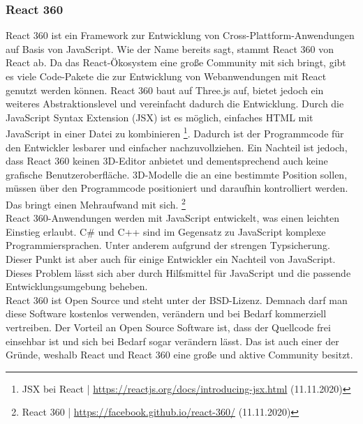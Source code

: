 \documentclass[a4paper,12pt,oneside]{article}
\begin{document}
      \subsubsection{React 360}
        React 360 ist ein Framework zur Entwicklung von Cross-Plattform-Anwendungen auf
        Basis von JavaScript. Wie der Name bereits sagt, stammt React 360 von React ab.
        Da das React-Ökosystem eine große Community mit sich bringt, gibt es viele
        Code-Pakete die zur Entwicklung von Webanwendungen mit React genutzt werden können.
        React 360 baut auf Three.js auf, bietet jedoch ein weiteres Abstraktionslevel und
        vereinfacht dadurch die Entwicklung. Durch die JavaScript Syntax Extension (JSX)
        ist es möglich, einfaches HTML mit JavaScript in einer Datei zu kombinieren \footnote{JSX bei React | \url{https://reactjs.org/docs/introducing-jsx.html} (11.11.2020)}.
        Dadurch ist der Programmcode für den Entwickler lesbarer und einfacher nachzuvollziehen.
        Ein Nachteil ist jedoch, dass React 360 keinen 3D-Editor anbietet und dementsprechend
        auch keine grafische Benutzeroberfläche. 3D-Modelle die
        an eine bestimmte Position sollen, müssen über den Programmcode positioniert und
        daraufhin kontrolliert werden. Das bringt einen Mehraufwand mit sich.
        \footnote{React 360 | \url{https://facebook.github.io/react-360/} (11.11.2020)} \\
        React 360-Anwendungen werden mit JavaScript entwickelt, was einen leichten Einstieg
        erlaubt. C\# und C++ sind im Gegensatz zu JavaScript komplexe
        Programmiersprachen. Unter anderem aufgrund der strengen Typsicherung. Dieser
        Punkt ist aber auch für einige Entwickler ein Nachteil von JavaScript. Dieses
        Problem lässt sich aber durch Hilfsmittel für JavaScript und die passende 
        Entwicklungsumgebung beheben. \\
        React 360 ist Open Source und steht unter der BSD-Lizenz. Demnach darf man diese
        Software kostenlos verwenden, verändern und bei Bedarf kommerziell vertreiben. Der
        Vorteil an Open Source Software ist, dass der Quellcode frei einsehbar ist und 
        sich bei Bedarf sogar verändern lässt. Das ist auch einer der Gründe, weshalb
        React und React 360 eine große und aktive Community besitzt. \\
\end{document}
